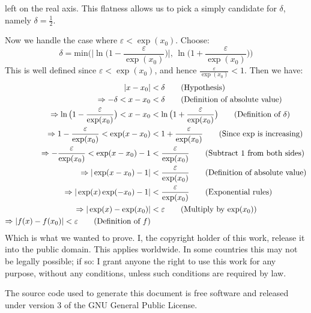 \documentclass{article}
\theoremstyle{normal}
\theoremstyle{plain}
\begin{document}
    left on the real axis. This flatness allows us to pick a simply candidate
    for $\delta$, namely $\delta=\frac{1}{2}$.
    \par\hfill\par
    Now we handle the case where $\varepsilon<\exp(x_{0})$. Choose:
    \begin{equation}
        \delta=\textrm{min}\Big(
            \big|\ln\big(1-\frac{\varepsilon}{\exp(x_{0})}\big)\big|,\,
            \ln\big(1+\frac{\varepsilon}{\exp(x_{0})}\big)
        \Big)
    \end{equation}
    This is well defined since $\varepsilon<\exp(x_{0})$, and hence
    $\frac{\varepsilon}{\exp(x_{0})}<1$. Then we have:
    \begin{align}
        |x-x_{0}|&<\delta
        \tag{Hypothesis}\\
        \Rightarrow
        -\delta<x-x_{0}&<\delta
        \tag{Definition of absolute value}\\
        \Rightarrow
        \ln\big(1-\frac{\varepsilon}{\exp(x_{0})}\big)
        <x-x_{0}
        &<\ln\big(1+\frac{\varepsilon}{\exp(x_{0})}\big)
        \tag{Definition of $\delta$}\\
        \Rightarrow
        1-\frac{\varepsilon}{\exp(x_{0})}
        <\exp(x-x_{0})
        &<1+\frac{\varepsilon}{\exp(x_{0})}
        \tag{Since $\exp$ is increasing}\\
        \Rightarrow
        -\frac{\varepsilon}{\exp(x_{0})}
        <\exp(x-x_{0})-1
        &<\frac{\varepsilon}{\exp(x_{0})}
        \tag{Subtract 1 from both sides}\\
        \Rightarrow
        |\exp(x-x_{0})-1|&<\frac{\varepsilon}{\exp(x_{0})}
        \tag{Definition of absolute value}\\
        \Rightarrow
        |\exp(x)\exp(-x_{0})-1|&<\frac{\varepsilon}{\exp(x_{0})}
        \tag{Exponential rules}\\
        \Rightarrow
        |\exp(x)-\exp(x_{0})|&<\varepsilon
        \tag{Multiply by $\exp(x_{0})$}\\
        \Rightarrow
        |f(x)-f(x_{0})|<\varepsilon
        \tag{Definition of $f$}
    \end{align}
    Which is what we wanted to prove.
    \newpage
    I, the copyright holder of this work, release it into the public domain.
    This applies worldwide. In some countries this may not be legally possible;
    if so: I grant anyone the right to use this work for any purpose, without
    any conditions, unless such conditions are required by law.
    \par\hfill\par
    The source code used to generate this document is free software and released
    under version 3 of the GNU General Public License.
\end{document}
